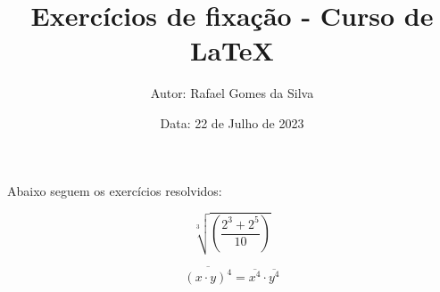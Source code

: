 \documentclass{article}
\title{\textbf{Exercícios de fixação - Curso de LaTeX}}
\author{Autor: Rafael Gomes da Silva}
\date{Data: 22 de Julho de 2023}
\begin{document}
\maketitle

Abaixo seguem os exercícios resolvidos:

\begin{equation}
	\sqrt[3]{\left(\frac{2^{3}+2^{5}}{10}\right)}
\end{equation}

\begin{equation}
	\overline{(x \cdot y)^{4}} = \overline{x^{4}} \cdot \overline{y^{4}}
\end{equation}
\end{document}
